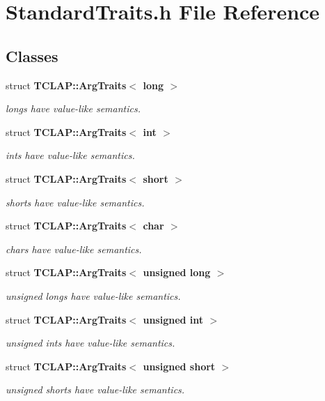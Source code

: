 \section{Standard\+Traits.\+h File Reference}
\label{StandardTraits_8h}
\subsection*{Classes}
\begin{DoxyCompactItemize}
\item 
struct {\bf T\+C\+L\+A\+P\+::\+Arg\+Traits$<$ long $>$}
\begin{DoxyCompactList}\small\item\em longs have value-\/like semantics. \end{DoxyCompactList}\item 
struct {\bf T\+C\+L\+A\+P\+::\+Arg\+Traits$<$ int $>$}
\begin{DoxyCompactList}\small\item\em ints have value-\/like semantics. \end{DoxyCompactList}\item 
struct {\bf T\+C\+L\+A\+P\+::\+Arg\+Traits$<$ short $>$}
\begin{DoxyCompactList}\small\item\em shorts have value-\/like semantics. \end{DoxyCompactList}\item 
struct {\bf T\+C\+L\+A\+P\+::\+Arg\+Traits$<$ char $>$}
\begin{DoxyCompactList}\small\item\em chars have value-\/like semantics. \end{DoxyCompactList}\item 
struct {\bf T\+C\+L\+A\+P\+::\+Arg\+Traits$<$ unsigned long $>$}
\begin{DoxyCompactList}\small\item\em unsigned longs have value-\/like semantics. \end{DoxyCompactList}\item 
struct {\bf T\+C\+L\+A\+P\+::\+Arg\+Traits$<$ unsigned int $>$}
\begin{DoxyCompactList}\small\item\em unsigned ints have value-\/like semantics. \end{DoxyCompactList}\item 
struct {\bf T\+C\+L\+A\+P\+::\+Arg\+Traits$<$ unsigned short $>$}
\begin{DoxyCompactList}\small\item\em unsigned shorts have value-\/like semantics. \end{DoxyCompactList}\item 

\end{DoxyCompactItemize}
